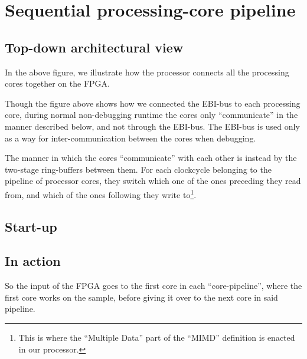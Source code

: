 \FloatBarrier
\section{Sequential processing-core pipeline}\label{section:sequential-pipeline}

\FloatBarrier
\subsection{Top-down architectural view}


In the above figure,  we
illustrate how the processor connects all the processing cores together on the
FPGA.

Though the  figure above shows
how we connected the EBI-bus \cite{efm_ebi} to each processing core, during
normal non-debugging runtime the cores only ``communicate'' in the manner
described below, and not through the EBI-bus. The EBI-bus is used only as a way
for inter-communication between the cores when debugging.

The manner in which the cores ``communicate'' with each other is instead by the
two-stage ring-buffers between them. For each clockcycle belonging to the
pipeline of processor cores, they switch which one of the ones preceding they
read from, and which of the ones following they write to\footnote{This is where
the ``Multiple Data'' part of the ``MIMD'' definition is enacted
in our processor.}.

\FloatBarrier
\subsection{Start-up}



\FloatBarrier
\subsection{In action}

So the input of the FPGA goes to the first core in each ``core-pipeline'', where
the first core works on the sample, before giving it over to the next core in
said pipeline.
